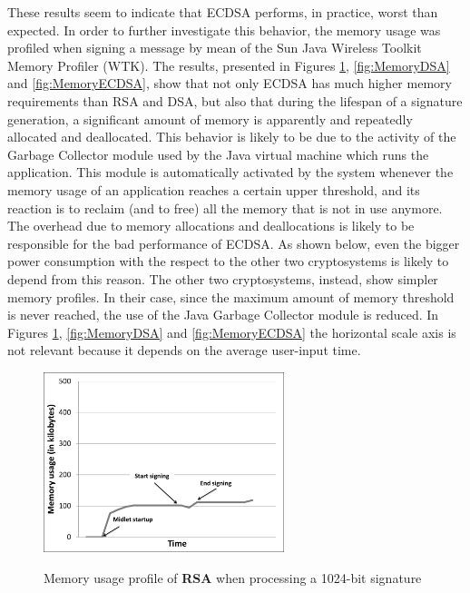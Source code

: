 \documentclass[authoryear]{elsarticle}
\begin{document}
These results seem to indicate that ECDSA performs, in practice, worst than expected. In order to further investigate this behavior, the memory usage was profiled when signing a message by mean of the Sun Java Wireless Toolkit Memory Profiler (WTK). The results, presented in Figures \ref{fig:MemoryRSA}, \ref{fig:MemoryDSA} and \ref{fig:MemoryECDSA}, show that not only ECDSA has much higher memory requirements than RSA and DSA, but also that during the lifespan of a signature generation, a significant amount of memory is apparently and repeatedly allocated and deallocated. This behavior is likely to be due to the activity of the Garbage Collector module used by the Java virtual machine which runs the application. This module is automatically activated by the system whenever the memory usage of an application reaches a certain upper threshold, and its reaction is to reclaim (and to free) all the memory that is not in use anymore. The overhead due to memory allocations and deallocations is likely to be responsible for the bad performance of ECDSA. As shown below, even the bigger power consumption with the respect to the other two cryptosystems is likely to depend from this reason. The other two cryptosystems, instead, show simpler memory profiles. In their case, since the maximum amount of memory threshold is never reached, the use of the Java Garbage Collector module is reduced. In Figures \ref{fig:MemoryRSA}, \ref{fig:MemoryDSA} and \ref{fig:MemoryECDSA} the horizontal scale axis is not relevant because it depends on the average user-input time.

\begin{figure}[ht]
\begin{center}
  \includegraphics[width=7cm]{immagini/MemoryRSA.pdf}\\
  \caption{Memory usage profile of \textbf{RSA} when processing a 1024-bit signature}
  \label{fig:MemoryRSA}
\end{center}
\end{figure}
\end{document}
